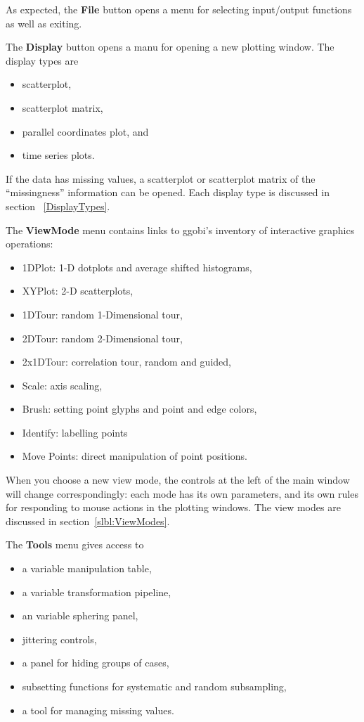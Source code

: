 \documentclass[11pt]{article}
\begin{document}
As expected, the {\bf File} button opens a menu for selecting
input/output functions as well as exiting.

The {\bf Display} button opens a manu for opening a new plotting
window.  The display types are
\begin{itemize}
\itemsep 0em
\item scatterplot,
\item scatterplot matrix, 
\item parallel coordinates plot, and
\item time series plots.
\end{itemize}

If the data has missing values, a scatterplot or scatterplot matrix
of the ``missingness'' information can be opened.  Each display type
is discussed in section ~\ref{DisplayTypes}.

The {\bf ViewMode} menu contains links to ggobi's
inventory of interactive graphics operations: 
\begin{itemize}
\itemsep 0em
\item 1DPlot: 1-D dotplots and average shifted histograms,
\item XYPlot: 2-D scatterplots,
\item 1DTour: random 1-Dimensional tour,
\item 2DTour: random 2-Dimensional tour,
\item 2x1DTour: correlation tour, random and guided,
\item Scale: axis scaling,
\item Brush: setting point glyphs and point and edge colors,
\item Identify: labelling points
\item Move Points: direct manipulation of point positions.
\end{itemize}

When you choose a new view mode, the controls at the left of
the main window will change correspondingly:  each mode has its
own parameters, and its own rules for responding to mouse actions
in the plotting windows.  The view modes
are discussed in section~\ref{slbl:ViewModes}.

The {\bf Tools} menu gives access to 
\begin{itemize}
\itemsep 0em
\item a variable manipulation table,
\item a variable transformation pipeline,
\item an variable sphering panel,
\item jittering controls,
\item a panel for hiding groups of cases,
\item subsetting functions for systematic and random subsampling, 
\item a tool for managing missing values.
\end{itemize}
\end{document}

